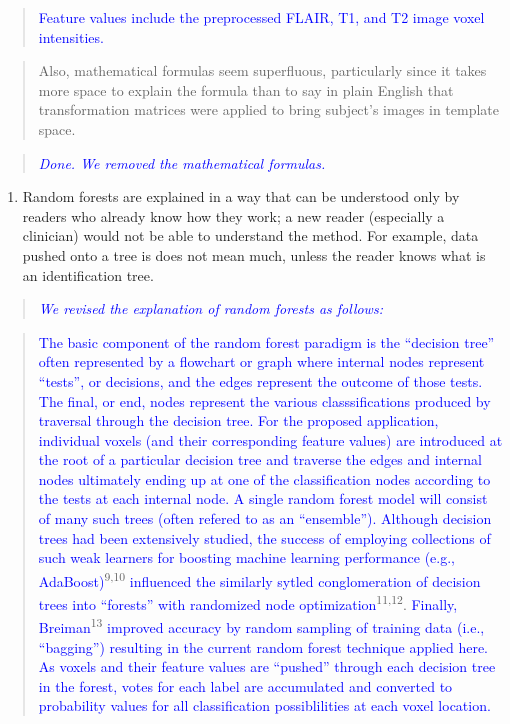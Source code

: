\documentclass[12pt,]{article}
\providecommand{\tightlist}{%
  \setlength{\itemsep}{0pt}\setlength{\parskip}{0pt}}
\begin{document}
\begin{quote}
\textcolor{blue}{Feature values include the preprocessed FLAIR, T1, and T2 image voxel intensities.}
\end{quote}

\begin{quote}
Also, mathematical formulas seem superfluous, particularly since it
takes more space to explain the formula than to say in plain English
that transformation matrices were applied to bring subject's images in
template space.
\end{quote}

\begin{quote}
\emph{\textcolor{blue}{Done.  We removed the mathematical formulas.}}
\end{quote}

\begin{enumerate}
\def\labelenumi{\arabic{enumi}.}
\setcounter{enumi}{6}
\tightlist
\item
  Random forests are explained in a way that can be understood only by
  readers who already know how they work; a new reader (especially a
  clinician) would not be able to understand the method. For example,
  data pushed onto a tree is does not mean much, unless the reader knows
  what is an identification tree.
\end{enumerate}

\begin{quote}
\emph{\textcolor{blue}{
We revised the explanation of random forests as follows:}}
\end{quote}

\begin{quote}
\textcolor{blue}{The basic component of
the random forest paradigm is the ``decision tree'' often represented by a flowchart or
graph where internal nodes represent ``tests'', or decisions, and the edges represent the outcome of those tests.  The final, or end, nodes represent the various classsifications produced by traversal through the decision tree.  For the proposed application, individual
voxels (and their corresponding feature values) are introduced at the root of a particular
decision tree and traverse the edges and internal nodes ultimately ending up at one of
the classification nodes according to the tests at each internal node.  A single random
forest model will consist of many such trees (often refered to as an ``ensemble'').}
\textcolor{blue}{Although decision trees had been extensively studied, the success of employing collections of such weak learners for boosting machine learning performance
(e.g., AdaBoost)}\textsuperscript{9,10}
\textcolor{blue}{influenced the similarly sytled conglomeration of decision trees into ``forests'' with randomized node optimization}\textsuperscript{11,12}.
\textcolor{blue}{Finally, Breiman}\textsuperscript{13}
\textcolor{blue}{improved accuracy by random sampling of training data (i.e., ``bagging'') resulting
in the current random forest technique applied here.}
\textcolor{blue}{As voxels and their feature values are ``pushed'' through each decision tree in the forest,  votes for each label are accumulated and converted to probability values for all classification possiblilities at
each voxel location.}
\end{quote}
\end{document}
